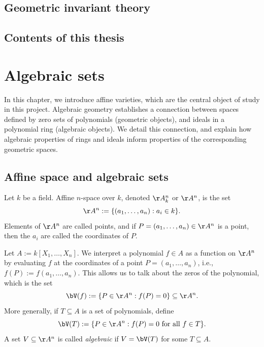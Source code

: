 \documentclass[12pt]{amsart}
\theoremstyle{plain}
\begin{document}
\subsection{Geometric invariant theory}





\subsection{Contents of this thesis}










\newpage
\section{Algebraic sets}\label{chapter:algebraicsubsets}
In this chapter, we introduce affine varieties, which are the central object of study in this project.
Algebraic geometry establishes a connection between spaces defined by zero sets of polynomials (geometric objects), and ideals in a polynomial ring (algebraic objects).
We detail this connection, and explain how algebraic properties of rings and ideals inform properties of the corresponding geometric spaces.





\subsection{Affine space and algebraic sets}
Let $k$ be a field.
Affine $n$-space over $k$, denoted $\AA^n_k$ or $\AA^n$, is the set 
$$\AA^n := \{(a_1, \ldots, a_n) : a_i \in k\}.$$
Elements of $\AA^n$ are called points, and if $P = (a_1, \ldots, a_n) \in \AA^n$ is a point, then the $a_i$ are called the coordinates of $P$.

Let $A := k[X_1, \ldots, X_n]$.
We interpret a polynomial $f \in A$ as a function on $\AA^n$ by evaluating $f$ at the coordinates of a point $P = (a_1, \ldots, a_n)$, i.e., $f(P) := f(a_1, \ldots, a_n).$
This allows us to talk about the zeros of the polynomial, which is the set
$$\bV(f) := \{P \in \AA^n : f(P) = 0\} \subseteq \AA^n.$$
More generally, if $T \subseteq A$ is a set of polynomials, define
$$\bV(T) := \{P \in \AA^n : f(P) = 0 \text{ for all } f \in T\}.$$
A set $V \subseteq \AA^n$ is called \emph{algebraic} if $V = \bV(T)$ for some $T \subseteq A$.
\end{document}
